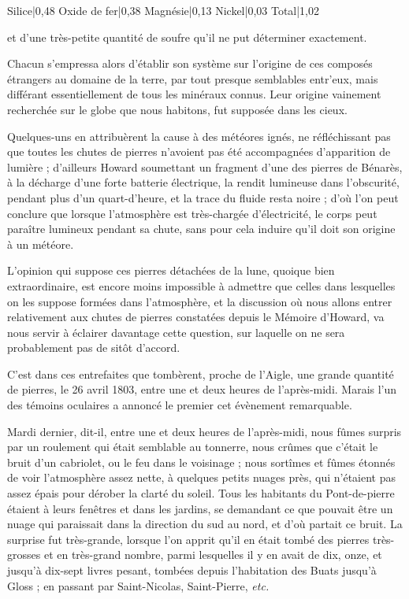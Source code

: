\documentclass[a4paper, 12pt, oneside, french]{article}
\begin{document}
Silice|0,48  
Oxide de fer|0,38  
Magnésie|0,13  
Nickel|0,03  
Total|1,02

et d'une très-petite quantité de soufre qu'il ne put déterminer exactement.

Chacun s'empressa alors d'établir son système sur l'origine de ces composés étrangers au domaine de la terre, par tout presque semblables entr'eux, mais différant essentiellement de tous les minéraux connus. Leur origine vainement recherchée sur le globe que nous habitons, fut supposée dans les cieux.

Quelques-uns en attribuèrent la cause à des météores ignés, ne réfléchissant pas que toutes les chutes de pierres n'avoient pas été accompagnées d'apparition de lumière ; d'ailleurs Howard soumettant un fragment d'une des pierres de Bénarès, à la décharge d'une forte batterie électrique, la rendit lumineuse dans l'obscurité, pendant plus d'un quart-d'heure, et la trace du fluide resta noire ; d'où l'on peut conclure que lorsque l'atmosphère est très-chargée d'électricité, le corps peut paraître lumineux pendant sa chute, sans pour cela induire qu'il doit son origine à un météore.

L'opinion qui suppose ces pierres détachées de la lune, quoique bien extraordinaire, est encore moins impossible à admettre que celles dans lesquelles on les suppose formées dans l'atmosphère, et la discussion où nous allons entrer relativement aux chutes de pierres constatées depuis le Mémoire d'Howard, va nous servir à éclairer davantage cette question, sur laquelle on ne sera probablement pas de sitôt d'accord.

C'est dans ces entrefaites que tombèrent, proche de l'Aigle, une grande quantité de pierres, le 26 avril 1803, entre une et deux heures de l'après-midi. Marais l'un des témoins oculaires a annoncé le premier cet évènement remarquable.

\og Mardi dernier, dit-il, entre une et deux heures de l'après-midi, nous fûmes surpris par un roulement qui était semblable au tonnerre, nous crûmes que c'était le bruit d'un cabriolet, ou le feu dans le voisinage ; nous sortîmes et fûmes étonnés de voir l'atmosphère assez nette, à quelques petits nuages près, qui n'étaient pas assez épais pour dérober la clarté du soleil. Tous les habitants du Pont-de-pierre étaient à leurs fenêtres et dans les jardins, se demandant ce que pouvait être un nuage qui paraissait dans la direction du sud au nord, et d'où partait ce bruit. La surprise fut très-grande, lorsque l'on apprit qu'il en était tombé des pierres très-grosses et en très-grand nombre, parmi lesquelles il y en avait de dix, onze, et jusqu'à dix-sept livres pesant, tombées depuis l'habitation des Buats jusqu'à Gloss ; en passant par Saint-Nicolas, Saint-Pierre, \emph{etc.} \fg
\end{document}
